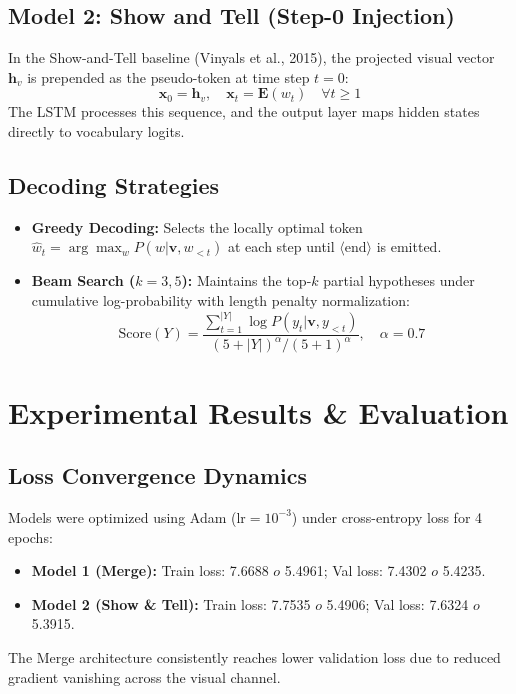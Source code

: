 \documentclass[conference]{IEEEtran}
\begin{document}
\subsection{Model 2: Show and Tell (Step-0 Injection)}
In the Show-and-Tell baseline (Vinyals et al., 2015), the projected visual vector $\mathbf{h}_v$ is prepended as the pseudo-token at time step $t=0$:
\begin{equation}
\mathbf{x}_0 = \mathbf{h}_v, \quad \mathbf{x}_t = \mathbf{E}(w_t) \quad \forall t \ge 1
\end{equation}
The LSTM processes this sequence, and the output layer maps hidden states directly to vocabulary logits.

\subsection{Decoding Strategies}
\begin{itemize}
    \item \textbf{Greedy Decoding:} Selects the locally optimal token $\hat{w}_t = \arg\max_{w} P(w | \mathbf{v}, w_{<t})$ at each step until $\langle\text{end}\rangle$ is emitted.
    \item \textbf{Beam Search ($k=3, 5$):} Maintains the top-$k$ partial hypotheses under cumulative log-probability with length penalty normalization:
    \begin{equation}
    \text{Score}(Y) = \frac{\sum_{t=1}^{|Y|} \log P(y_t | \mathbf{v}, y_{<t})}{(5 + |Y|)^\alpha / (5 + 1)^\alpha}, \quad \alpha = 0.7
    \end{equation}
\end{itemize}

\section{Experimental Results \& Evaluation}
\subsection{Loss Convergence Dynamics}
Models were optimized using Adam ($\text{lr}=10^{-3}$) under cross-entropy loss for 4 epochs:
\begin{itemize}
    \item \textbf{Model 1 (Merge):} Train loss: 7.6688 $	o$ 5.4961; Val loss: 7.4302 $	o$ 5.4235.
    \item \textbf{Model 2 (Show \& Tell):} Train loss: 7.7535 $	o$ 5.4906; Val loss: 7.6324 $	o$ 5.3915.
\end{itemize}
The Merge architecture consistently reaches lower validation loss due to reduced gradient vanishing across the visual channel.
\end{document}
